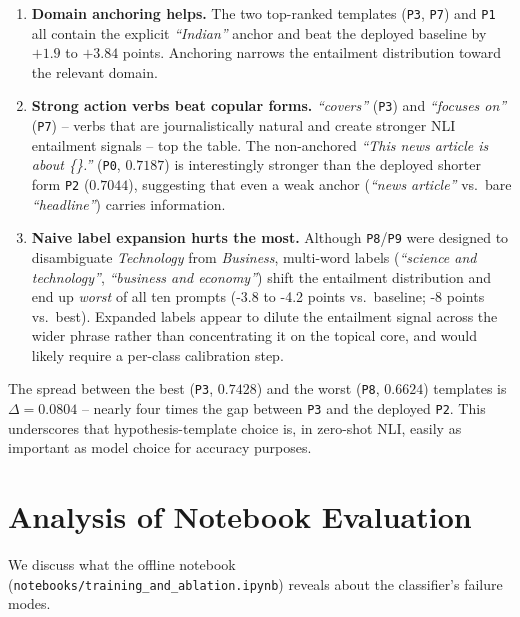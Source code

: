 \documentclass[10pt,twocolumn,letterpaper]{article}
\begin{document}
\begin{enumerate}
    \item \textbf{Domain anchoring helps.} The two top-ranked templates (\texttt{P3}, \texttt{P7}) and \texttt{P1} all contain the explicit \textit{``Indian''} anchor and beat the deployed baseline by $+1.9$ to $+3.84$ points. Anchoring narrows the entailment distribution toward the relevant domain.
    \item \textbf{Strong action verbs beat copular forms.} \textit{``covers''} (\texttt{P3}) and \textit{``focuses on''} (\texttt{P7}) -- verbs that are journalistically natural and create stronger NLI entailment signals -- top the table. The non-anchored \textit{``This news article is about \{\}.''} (\texttt{P0}, $0.7187$) is interestingly stronger than the deployed shorter form \texttt{P2} ($0.7044$), suggesting that even a weak anchor (\textit{``news article''} vs.\ bare \textit{``headline''}) carries information.
    \item \textbf{Naive label expansion hurts the most.} Although \texttt{P8}/\texttt{P9} were designed to disambiguate \textit{Technology} from \textit{Business}, multi-word labels (\textit{``science and technology''}, \textit{``business and economy''}) shift the entailment distribution and end up \emph{worst} of all ten prompts (-3.8 to -4.2 points vs.\ baseline; -8 points vs.\ best). Expanded labels appear to dilute the entailment signal across the wider phrase rather than concentrating it on the topical core, and would likely require a per-class calibration step.
\end{enumerate}

The spread between the best (\texttt{P3}, $0.7428$) and the worst (\texttt{P8}, $0.6624$) templates is $\Delta = 0.0804$ -- nearly four times the gap between \texttt{P3} and the deployed \texttt{P2}. This underscores that hypothesis-template choice is, in zero-shot NLI, easily as important as model choice for accuracy purposes.

\section{Analysis of Notebook Evaluation}
\label{sec:analysis}
We discuss what the offline notebook (\texttt{notebooks/training\_and\_ablation.ipynb}) reveals about the classifier's failure modes.
\end{document}
